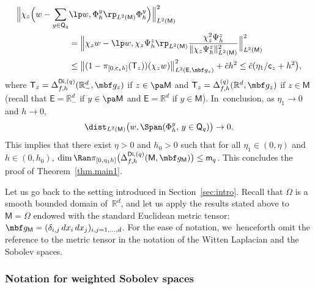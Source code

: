 \begin{align*}
\Big \Vert \chi_z\Bigl(w- \sum_{y \in \mathsf Q_q}& \lp w, \Phi_h^y\rp _{L^2(\mathsf M)} \Phi_h^y\Bigr) \Big \Vert_{L^2(\mathsf M)}^2 \\ &= \Big \Vert \chi_z w - \lp w, \chi_z \Psi_h^z\rp _{L^2(\mathsf M)} \frac{\chi_z^2 \Psi_h^z }{ \Vert \chi_z\Psi_h^z \Vert_{L^2(\mathsf M)}^2}\Big \Vert_{L^2(\mathsf M)}^2 \\
&\le \big \Vert (1-\pi_{[0,\mathsf c_zh]} (\mathsf T_z))(\chi_z w)\big \Vert_{L^2(\mathsf E,\mbf g_z)}^2 + \tilde{c} h^2\le \tilde{c}(\eta_1/\mathsf c_z +h^2 \bigr),
\end{align*}
where $\mathsf T_z=\Delta_{f,h}^{\mathsf{Di},(q)}(\mathbb R^d_-,\mbf g_z)$ if $z\in \pa \mathsf M$ and $\mathsf T_z=\Delta_{f,h}^{(q)}(\mathbb R^d,\mbf g_z)$ if $z\in \mathsf M$ (recall that $\mathsf E=\mathbb R^d_-$ if $y\in \pa \mathsf M$ and $\mathsf E=\mathbb R^d$ if $ y\in \mathsf M$). In~conclusion, as $\eta_1\to 0$ and $h\to 0$,
\[
\dist_{L^2(\mathsf M)}\bigl(w, \Span (\Phi_h^y, \, y\in \mathsf Q_q) \bigr)\to 0.
\]
This implies that there exist $\eta>0$ and $h_0>0$ such that for all $\eta_1\in (0,\eta)$ and $h\in (0,h_0)$, $\dim \Ran \pi_{[0,\eta_1h]}\bigl(\Delta_{f,h}^{\mathsf{Di},(q)}(\mathsf M,\mbf g_{\mathsf M})\bigr)\le \mathsf m_q$. This concludes the proof of Theorem~\ref{thm.main1}.

\label{sec.seclienwitten}
Let us go back to the setting introduced in Section~\ref{sec:intro}.
Recall that $\Omega$ is a smooth bounded domain of~$\mathbb R^d$,
and let us apply the results stated above to $\mathsf M=\Omega$
endowed with the standard Euclidean metric tensor: $\mbf
g_{\mathsf M} =(\delta_{i,j} \, dx_i \, dx_j)_{i,j=1,\ldots,d}$. For
the ease of notation, we~henceforth omit the reference to the metric tensor in the notation of the Witten Laplacian and the Sobolev spaces.

\subsubsection{Notation for weighted Sobolev spaces}
\label{sec.not-Sw}

